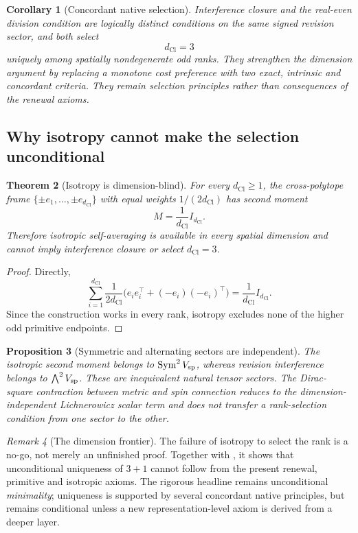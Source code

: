 \documentclass[11pt]{article}
\newtheorem{theorem}{Theorem}[section]
\newtheorem{proposition}[theorem]{Proposition}
\newtheorem{corollary}[theorem]{Corollary}
\theoremstyle{definition}
\theoremstyle{remark}
\newtheorem{remark}[theorem]{Remark}
\newcommand{\dCl}{d_{\mathrm{Cl}}}
\begin{document}
\begin{corollary}[Concordant native selection]
\label{cor:concordant-native-selection}
Interference closure and the real-even division condition are logically distinct
conditions on the same signed revision sector, and both select
\[
 \boxed{\dCl=3}
\]
uniquely among spatially nondegenerate odd ranks.  They strengthen the dimension
argument by replacing a monotone cost preference with two exact, intrinsic and
concordant criteria.  They remain selection principles rather than consequences
of the renewal axioms.
\end{corollary}

\subsection{Why isotropy cannot make the selection unconditional}
\label{subsec:isotropy-dimension-no-go}

\begin{theorem}[Isotropy is dimension-blind]
\label{thm:isotropy-dimension-blind}
For every $\dCl\ge1$, the cross-polytope frame
$\{\pm e_1,\ldots,\pm e_{\dCl}\}$ with equal weights $1/(2\dCl)$ has second
moment
\[
 M=\frac1{\dCl}I_{\dCl}.
\]
Therefore isotropic self-averaging is available in every spatial dimension and
cannot imply interference closure or select $\dCl=3$.
\end{theorem}

\begin{proof}
Directly,
\[
 \sum_{i=1}^{\dCl}\frac1{2\dCl}
 \bigl(e_ie_i^{\top}+(-e_i)(-e_i)^{\top}\bigr)
 =\frac1{\dCl}I_{\dCl}.
\]
Since the construction works in every rank, isotropy excludes none of the higher
odd primitive endpoints.
\end{proof}

\begin{proposition}[Symmetric and alternating sectors are independent]
\label{prop:symmetric-alternating-independence}
The isotropic second moment belongs to $\operatorname{Sym}^2V_{\rm sp}$, whereas
revision interference belongs to $\bigwedge^2V_{\rm sp}$.  These are inequivalent
natural tensor sectors.  The Dirac-square contraction between metric and spin
connection reduces to the dimension-independent Lichnerowicz scalar term and does
not transfer a rank-selection condition from one sector to the other.
\end{proposition}

\begin{remark}[The dimension frontier]
\label{rem:honest-dimension-frontier}
The failure of isotropy to select the rank is a no-go, not merely an unfinished
proof.  Together with , it shows that unconditional
uniqueness of $3+1$ cannot follow from the present renewal, primitive and isotropic
axioms.  The rigorous headline remains unconditional \emph{minimality}; uniqueness
is supported by several concordant native principles, but remains conditional
unless a new representation-level axiom is derived from a deeper layer.
\end{remark}
\end{document}
